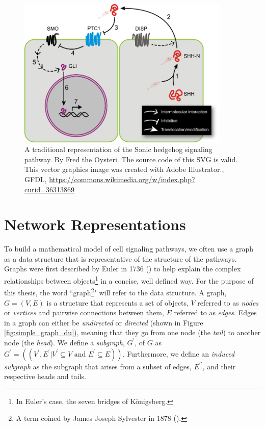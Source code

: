\documentclass[12pt,twoside]{reedthesis}
\theoremstyle{definition}
\begin{document}
 \begin{figure}[!h]
   \begin{center}
     \includegraphics[width=4in]{Sonic_hedgehog_pathway}
   \caption[Sonic hedgehog signal transduction.]{A traditional representation of the Sonic hedgehog signaling pathway. By Fred the Oysteri. The source code of this SVG is valid. This vector graphics image was created with Adobe Illustrator., GFDL, \url{https://commons.wikimedia.org/w/index.php?curid=36313869}}
   \label{fig:shh}
   \end{center}
 \end{figure}

 \section{Network Representations}

  To build a mathematical model of cell signaling pathways, we often use a graph as a data structure that is representative of the structure of the pathways. Graphs were first described by Euler in 1736 (\cite{Shields2012}) to help explain the complex relationships between objects\footnote{In Euler's case, the seven bridges of K\"{o}nigsberg.} in a concise, well defined way. For the purpose of this thesis, the word ``graph\footnote{A term coined by James Joseph Sylvester in 1878 (\cite{Biggs1986}).}" will refer to the data structure. A graph, $G=(V,E)$ is a structure that represents a set of objects, $V$ referred to as \textit{nodes} or \textit{vertices} and pairwise connections between them, $E$ referred to as \textit{edges}. Edges in a graph can either be \textit{undirected} or \textit{directed} (shown in Figure \ref{fig:simple_graph_du}), meaning that they go from one node (the \textit{tail}) to another node (the \textit{head}). We define a \textit{subgraph}, $G^\prime$, of $G$ as $G^\prime=((V^\prime,E^\prime | V^\prime \subseteq V \text{ and } E^\prime \subseteq E))$. Furthermore, we define an \textit{induced subgraph} as the subgraph that arises from a subset of edges, $E^{\prime\prime}$, and their respective heads and tails.\par
\end{document}
